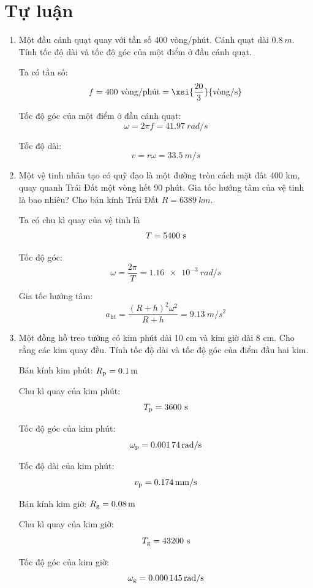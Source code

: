 \section{Tự luận}
\begin{enumerate}[label=\bfseries Câu \arabic*:]
	
	\item {}
	
	
	{
		Một đầu cánh quạt quay với tần số 400 vòng/phút. Cánh quạt dài $\SI{0.8}{m}$. Tính tốc độ dài và tốc độ góc của một điểm ở đầu cánh quạt.
	}
	
	\hideall
	{	
		Ta có tần số:
		$$f=400\ \text{vòng/phút} = \xsi{\dfrac{20}{3}}{\text{vòng/s}}$$
		
		Tốc độ góc của một điểm ở đầu cánh quạt:
		$$\omega = 2\pi f = \SI{41.97}{rad/s}$$
		
		Tốc độ dài:
		$$v=r \omega = \SI{33.5}{m/s}$$
	}
	\item {}
	
	
	{
		Một vệ tinh nhân tạo có quỹ đạo là một đường tròn cách mặt đất 400 km, quay quanh Trái Đất một vòng hết 90 phút. Gia tốc hướng tâm của vệ tinh là bao nhiêu? Cho bán kính Trái Đất $R=\SI{6389}{km}$.
	}
	
	\hideall
	{	
		Ta có chu kì quay của vệ tinh là
		$$T=5400\ \text s$$
		
		Tốc độ góc:
		$$\omega = \dfrac{2\pi}{T} = \SI{1.16e-3}{rad/s}$$
		
		Gia tốc hướng tâm:
		$$a_\text{ht} = \dfrac{(R+h)^2 \omega^2}{R+h} = \SI{9.13}{m/s^2}$$
	}
	\item {}
	
	
	{
		Một đồng hồ treo tường có kim phút dài 10 cm và kim giờ dài 8 cm. Cho rằng các kim quay đều. Tính tốc độ dài và tốc độ góc của điểm đầu hai kim.
	}
	
	\hideall
	{	
		Bán kính kim phút: $R_\text p = \SI{0.1}{m}$
		
		Chu kì quay của kim phút: $$T_\text p = 3600\ \text s$$
		
		Tốc độ góc của kim phút:
		$$\omega_\text p = \SI{0.00174}{rad/s}$$
		
		Tốc độ dài của kim phút:
		$$v_\text p = \SI{0.174}{mm/s}$$
		
		Bán kính kim giờ: $R_\text g = \SI{0.08}{m}$
		
		Chu kì quay của kim giờ: $$T_\text g = 43200\ \text s$$
		
		Tốc độ góc của kim giờ:
		$$\omega_\text g = \SI{0.000145}{rad/s}$$
		
}
\end{enumerate}
